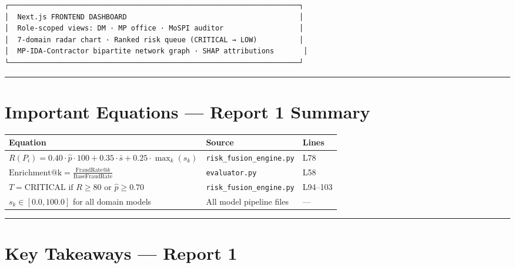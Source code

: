 \documentclass[11pt,a4paper]{article}
\begin{document}
\begin{tcolorbox}[colback=gray!5!white,colframe=gray!60!black,arc=1mm,boxrule=0.6pt,left=6pt,right=6pt,top=6pt,bottom=6pt]
\begin{lstlisting}[basicstyle=\ttfamily\scriptsize,breaklines=true,columns=flexible]
┌─────────────────────────────────────────────────────────────────────┐
│  Next.js FRONTEND DASHBOARD                                         │
│  Role-scoped views: DM · MP office · MoSPI auditor                  │
│  7-domain radar chart · Ranked risk queue (CRITICAL → LOW)          │
│  MP-IDA-Contractor bipartite network graph · SHAP attributions       │
└─────────────────────────────────────────────────────────────────────┘
\end{lstlisting}
\end{tcolorbox}


\vspace{1em}\hrule\vspace{1em}

\section{Important Equations --- Report 1 Summary}

\begin{table}[htbp]
\centering
\small
\begin{tabularx}{\textwidth}{l l Y}
\toprule
\textbf{Equation} & \textbf{Source} & \textbf{Lines} \\
\midrule
$R(P_i) = 0.40 \cdot \hat{p} \cdot 100 + 0.35 \cdot \bar{s} + 0.25 \cdot \max_k(s_k)$ & \texttt{risk\_fusion\_engine.py} & L78 \\
$\text{Enrichment@k} = \frac{\text{FraudRate}@k}{\text{BaseFraudRate}}$ & \texttt{evaluator.py} & L58 \\
$T = \text{CRITICAL if } R \geq 80 \text{ or } \hat{p} \geq 0.70$ & \texttt{risk\_fusion\_engine.py} & L94–103 \\
$s_k \in [0.0, 100.0]$ for all domain models & All model pipeline files & — \\
\bottomrule
\end{tabularx}
\end{table}


\vspace{1em}\hrule\vspace{1em}

\section{Key Takeaways --- Report 1}
\end{document}
